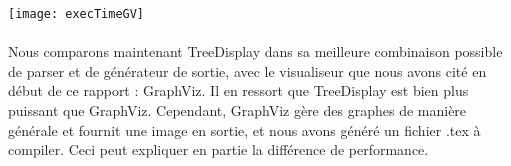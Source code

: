 \begin{center}

\texttt{[image: execTimeGV]}

\end{center}

\paragraph{} Nous comparons maintenant TreeDisplay dans sa meilleure combinaison possible de parser et de générateur de sortie, avec le visualiseur que nous avons cité en début de ce rapport : GraphViz. Il en ressort que TreeDisplay est bien plus puissant que GraphViz. Cependant, GraphViz gère des graphes de manière générale et fournit une image en sortie, et nous avons généré un fichier .tex à compiler. Ceci peut expliquer en partie la différence de performance.